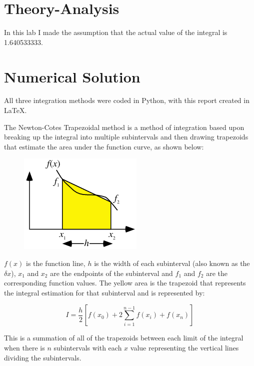 \documentclass[12pt, letterpaper]{article}
\begin{document}
\section{\label{sec:theory}Theory-Analysis}
	
	
	In this lab I made the assumption that the actual value of the integral is 1.640533333.

	 
\section{\label{solution}Numerical Solution}
	All three integration methods were coded in Python, with this report created in \LaTeX{}.
	
	The Newton-Cotes Trapezoidal method is a method of integration based upon breaking up the integral into multiple subintervals and then drawing trapezoids that estimate the area under the function curve, as shown below:
	
	\begin{figure}[h]
            		\centering
            		\includegraphics[width=0.5\linewidth]{trapezoid.png}
            	\end{figure}
	
	 \newpage$f(x)$ is the function line, $h$ is the width of each subinterval (also known as the $\delta x$), $x_1$ and $x_2$ are the endpoints of the subinterval and $f_1$ and $f_2$ are the corresponding function values. The yellow area is the trapezoid that represents the integral estimation for that subinterval and is represented by:
	 
	 \begin{equation*} I = \frac{h}{2} \left[f(x_0)+2\sum_{i=1}^{n-1}{f(x_i)}+f(x_n)\right] \end{equation*}
	 
	 This is a summation of all of the trapezoids between each limit of the integral when there is $n$ subintervals with each $x$ value representing the vertical lines dividing the subintervals.
	 
\end{document}
